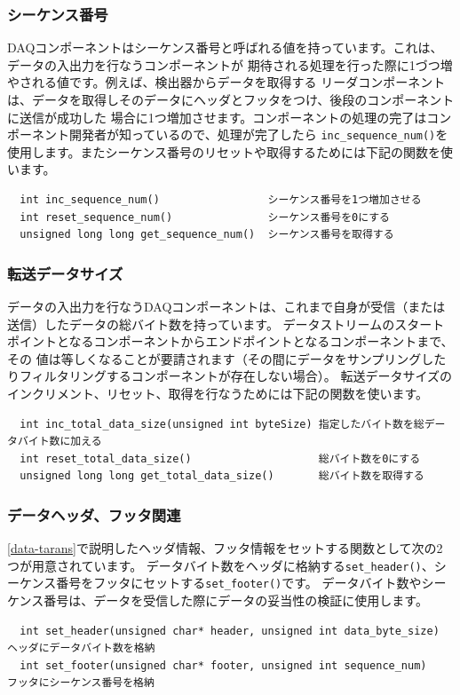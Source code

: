 \documentclass[a4j,10pt,dvips,onecolumn,oneside,final]{jarticle}%
\begin{document}
\subsubsection{シーケンス番号}\label{seq}
DAQコンポーネントはシーケンス番号と呼ばれる値を持っています。これは、データの入出力を行なうコンポーネントが
期待される処理を行った際に1づつ増やされる値です。例えば、検出器からデータを取得する
リーダコンポーネントは、データを取得しそのデータにヘッダとフッタをつけ、後段のコンポーネントに送信が成功した
場合に1つ増加させます。コンポーネントの処理の完了はコンポーネント開発者が知っているので、処理が完了したら
\verb|inc_sequence_num()|を使用します。またシーケンス番号のリセットや取得するためには下記の関数を使います。
\begin{Verbatim}
  int inc_sequence_num()                 シーケンス番号を1つ増加させる
  int reset_sequence_num()               シーケンス番号を0にする
  unsigned long long get_sequence_num()  シーケンス番号を取得する
\end{Verbatim}

\subsubsection{転送データサイズ}\label{datasize}
データの入出力を行なうDAQコンポーネントは、これまで自身が受信（または送信）したデータの総バイト数を持っています。
データストリームのスタートポイントとなるコンポーネントからエンドポイントとなるコンポーネントまで、その
値は等しくなることが要請されます（その間にデータをサンプリングしたりフィルタリングするコンポーネントが存在しない場合）。
転送データサイズのインクリメント、リセット、取得を行なうためには下記の関数を使います。
\begin{Verbatim}
  int inc_total_data_size(unsigned int byteSize) 指定したバイト数を総データバイト数に加える
  int reset_total_data_size()                    総バイト数を0にする
  unsigned long long get_total_data_size()       総バイト数を取得する
\end{Verbatim}

\subsubsection{データヘッダ、フッタ関連}\label{header}
\ref{data-tarans}で説明したヘッダ情報、フッタ情報をセットする関数として次の2つが用意されています。
データバイト数をヘッダに格納する\verb|set_header()|、シーケンス番号をフッタにセットする\verb|set_footer()|です。
データバイト数やシーケンス番号は、データを受信した際にデータの妥当性の検証に使用します。
\begin{Verbatim}
  int set_header(unsigned char* header, unsigned int data_byte_size) ヘッダにデータバイト数を格納
  int set_footer(unsigned char* footer, unsigned int sequence_num)   フッタにシーケンス番号を格納
\end{Verbatim}
\end{document}
